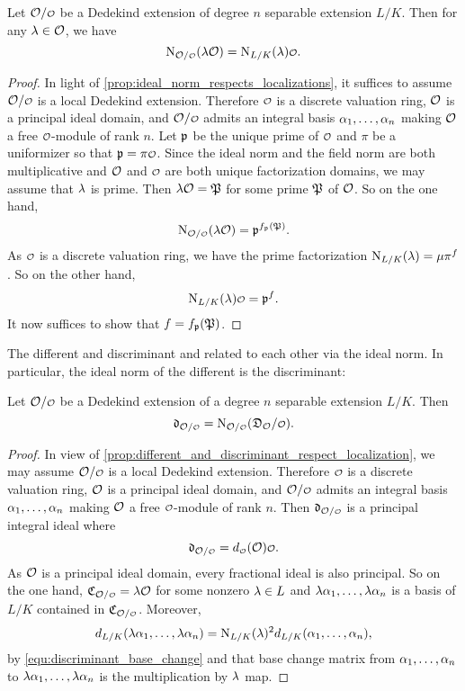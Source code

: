 \documentclass[12pt,oneside]{book}
\begin{document}
    \begin{proposition}\label{prop:ideal_norm_respects_field_trace}
      Let $\mc{O}/\smc{O}$ be a Dedekind extension of degree $n$ separable extension $L/K$. Then for any $\lambda \in \mathcal{O}$, we have
      \[
        \Norm_{\mc{O}/\smc{O}}(\l\mc{O}) = \Norm_{L/K}(\l)\smc{O}.
      \]
    \end{proposition}
    \begin{proof}
      In light of \cref{prop:ideal_norm_respects_localizations}, it suffices to assume $\mc{O}/\smc{O}$ is a local Dedekind extension. Therefore $\smc{O}$ is a discrete valuation ring, $\mathcal{O}$ is a principal ideal domain, and $\mc{O}/\smc{O}$ admits an integral basis $\alpha_{1},\ldots,\alpha_{n}$ making $\mathcal{O}$ a free $\smc{O}$-module of rank $n$. Let $\mathfrak{p}$ be the unique prime of $\smc{O}$ and $\pi$ be a uniformizer so that $\mf{p} = \pi\smc{O}$. Since the ideal norm and the field norm are both multiplicative and $\mathcal{O}$ and $\smc{O}$ are both unique factorization domains, we may assume that $\lambda$ is prime. Then $\lambda\mathcal{O} = \mathfrak{P}$ for some prime $\mathfrak{P}$ of $\mathcal{O}$. So on the one hand,
      \[
        \Norm_{\mc{O}/\smc{O}}(\l\mc{O}) = \mf{p}^{f_{\mf{p}}(\mf{P})}.
      \]
      As $\smc{O}$ is a discrete valuation ring, we have the prime factorization $\operatorname{\mathrm{N}}_{L/K}(\lambda) = \mu\pi^{f}$. So on the other hand,
      \[
        \Norm_{L/K}(\l)\smc{O} = \mf{p}^{f}.
      \]
      It now suffices to show that $f = f_{\mathfrak{p}}(\mathfrak{P})$. 
    \end{proof}

    The different and discriminant and related to each other via the ideal norm. In particular, the ideal norm of the different is the discriminant:

    \begin{proposition}\label{prop:norm_of_different_is_discriminant}
      Let $\mc{O}/\smc{O}$ be a Dedekind extension of a degree $n$ separable extension $L/K$. Then
      \[
        \mf{d}_{\mc{O}/\smc{O}} = \Norm_{\mc{O}/\smc{O}}(\mf{D}_\mc{O}/\smc{O}).
      \] 
    \end{proposition}
    \begin{proof}
      In view of \cref{prop:different_and_discriminant_respect_localization}, we may assume $\mc{O}/\smc{O}$ is a local Dedekind extension. Therefore $\smc{O}$ is a discrete valuation ring, $\mathcal{O}$ is a principal ideal domain, and $\mc{O}/\smc{O}$ admits an integral basis $\alpha_{1},\ldots,\alpha_{n}$ making $\mathcal{O}$ a free $\smc{O}$-module of rank $n$. Then $\mf{d}_{\mc{O}/\smc{O}}$ is a principal integral ideal where
      \[
        \mf{d}_{\mc{O}/\smc{O}} = d_{\smc{O}}(\mc{O})\smc{O}.
      \]
      As $\mathcal{O}$ is a principal ideal domain, every fractional ideal is also principal. So on the one hand, $\mf{C}_{\mc{O}/\smc{O}} = \l\mc{O}$ for some nonzero $\lambda \in L$ and $\lambda\alpha_{1},\ldots,\lambda\alpha_{n}$ is a basis of $L/K$ contained in $\mf{C}_{\mc{O}/\smc{O}}$. Moreover,
      \[
        d_{L/K}(\lambda\alpha_{1},\ldots,\lambda\alpha_{n}) = \operatorname{\mathrm{N}}_{L/K}(\lambda)^{2}d_{L/K}(\alpha_{1},\ldots,\alpha_{n}),
      \]
      by \cref{equ:discriminant_base_change} and that base change matrix from $\alpha_{1},\ldots,\alpha_{n}$ to $\lambda\alpha_{1},\ldots,\lambda\alpha_{n}$ is the multiplication by $\lambda$ map. 
    \end{proof}
\end{document}
